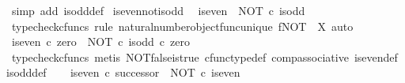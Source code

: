 \begin{isabellebody}
\ {\isacharparenleft}{\kern0pt}simp\ add{\isacharcolon}{\kern0pt}\ is{\isacharunderscore}{\kern0pt}odd{\isacharunderscore}{\kern0pt}def{}{\isacharparenright}{\kern0pt}%
\endisatagproof
{\isafoldproof}%
%
\isadelimproof
\isanewline
%
\endisadelimproof
\isanewline
{}\isamarkupfalse%
\ is{\isacharunderscore}{\kern0pt}even{\isacharunderscore}{\kern0pt}not{\isacharunderscore}{\kern0pt}is{\isacharunderscore}{\kern0pt}odd{\isacharcolon}{\kern0pt}\isanewline
\ \ {\isachardoublequoteopen}is{\isacharunderscore}{\kern0pt}even\ {\isacharequal}{\kern0pt}\ NOT\ {\isasymcirc}\isactrlsub c\ is{\isacharunderscore}{\kern0pt}odd{\isachardoublequoteclose}\isanewline
%
\isadelimproof
%
\endisadelimproof
%
\isatagproof
{}\isamarkupfalse%
\ {\isacharparenleft}{\kern0pt}typecheck{\isacharunderscore}{\kern0pt}cfuncs{\isacharcomma}{\kern0pt}\ rule\ natural{\isacharunderscore}{\kern0pt}number{\isacharunderscore}{\kern0pt}object{\isacharunderscore}{\kern0pt}func{\isacharunderscore}{\kern0pt}unique{\isacharbrackleft}{\kern0pt}\ f{\isacharequal}{\kern0pt}{\isachardoublequoteopen}NOT{\isachardoublequoteclose}{\isacharcomma}{\kern0pt}\ \ X{\isacharequal}{\kern0pt}{\isachardoublequoteopen}{\isasymOmega}{\isachardoublequoteclose}{\isacharbrackright}{\kern0pt}{\isacharcomma}{\kern0pt}\ auto{\isacharparenright}{\kern0pt}\isanewline
\ \ \isamarkupfalse%
\ {\isachardoublequoteopen}is{\isacharunderscore}{\kern0pt}even\ {\isasymcirc}\isactrlsub c\ zero\ {\isacharequal}{\kern0pt}\ {\isacharparenleft}{\kern0pt}NOT\ {\isasymcirc}\isactrlsub c\ is{\isacharunderscore}{\kern0pt}odd{\isacharparenright}{\kern0pt}\ {\isasymcirc}\isactrlsub c\ zero{\isachardoublequoteclose}\isanewline
\ \ \ \ \isamarkupfalse%
\ {\isacharparenleft}{\kern0pt}typecheck{\isacharunderscore}{\kern0pt}cfuncs{\isacharcomma}{\kern0pt}\ metis\ NOT{\isacharunderscore}{\kern0pt}false{\isacharunderscore}{\kern0pt}is{\isacharunderscore}{\kern0pt}true\ cfunc{\isacharunderscore}{\kern0pt}type{\isacharunderscore}{\kern0pt}def\ comp{\isacharunderscore}{\kern0pt}associative\ is{\isacharunderscore}{\kern0pt}even{\isacharunderscore}{\kern0pt}def{}\ is{\isacharunderscore}{\kern0pt}odd{\isacharunderscore}{\kern0pt}def{}{\isacharparenright}{\kern0pt}\isanewline
\isanewline
\ \ \isamarkupfalse%
\ {\isachardoublequoteopen}is{\isacharunderscore}{\kern0pt}even\ {\isasymcirc}\isactrlsub c\ successor\ {\isacharequal}{\kern0pt}\ NOT\ {\isasymcirc}\isactrlsub c\ is{\isacharunderscore}{\kern0pt}even{\isachardoublequoteclose}\isanewline

\end{isabellebody}
